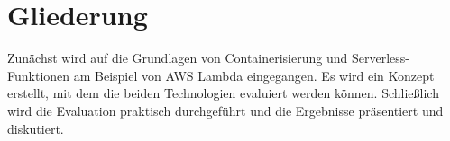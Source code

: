 \section{Gliederung}
Zunächst wird auf die Grundlagen von Containerisierung und Serverless-Funktionen am Beispiel von \ac{AWS} Lambda eingegangen. Es wird ein Konzept erstellt, mit dem die beiden Technologien evaluiert werden können. Schließlich wird die Evaluation praktisch durchgeführt und die Ergebnisse präsentiert und diskutiert.